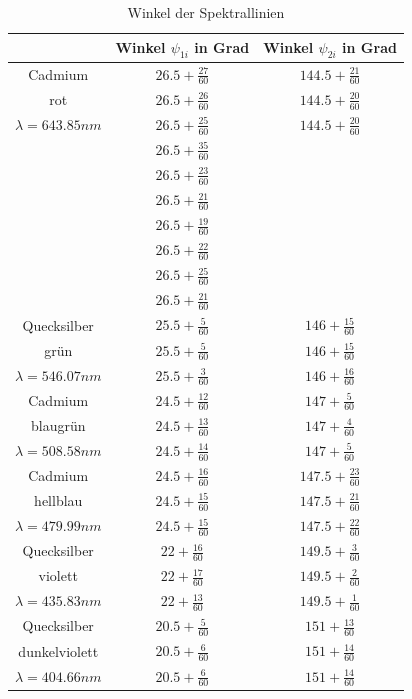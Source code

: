 \documentclass[12pt,a4paper]{article}
\begin{document}
\begin{table}[H]
	\centering
	\begin{tabular}{|c|c|c|}
		\hline
		& Winkel $\psi_{1i}$ in Grad & Winkel $\psi_{2i}$ in Grad\\
		\hline
		Cadmium&$26.5+\frac{27}{60}$&$144.5+\frac{21}{60}$\\[0.1cm]
		rot&$26.5+\frac{26}{60}$&$144.5+\frac{20}{60}$\\[0.1cm]
		$\lambda=643.85nm$&$26.5+\frac{25}{60}$&$144.5+\frac{20}{60}$\\[0.1cm]
		&$26.5+\frac{35}{60}$&\\[0.1cm]
		&$26.5+\frac{23}{60}$&\\[0.1cm]
		&$26.5+\frac{21}{60}$&\\[0.1cm]
		&$26.5+\frac{19}{60}$&\\[0.1cm]
		&$26.5+\frac{22}{60}$&\\[0.1cm]
		&$26.5+\frac{25}{60}$&\\[0.1cm]
		&$26.5+\frac{21}{60}$&\\[0.1cm]
		\hline
		Quecksilber&$25.5+\frac{5}{60}$&$146+\frac{15}{60}$\\[0.1cm]
		grün&$25.5+\frac{5}{60}$&$146+\frac{15}{60}$\\[0.1cm]
		$\lambda=546.07nm$&$25.5+\frac{3}{60}$&$146+\frac{16}{60}$\\[0.1cm]
		\hline
		Cadmium&$24.5+\frac{12}{60}$&$147+\frac{5}{60}$\\[0.1cm]
		blaugrün&$24.5+\frac{13}{60}$&$147+\frac{4}{60}$\\[0.1cm]
		$\lambda=508.58nm$&$24.5+\frac{14}{60}$&$147+\frac{5}{60}$\\[0.1cm]
		\hline
		Cadmium&$24.5+\frac{16}{60}$&$147.5+\frac{23}{60}$\\[0.1cm]
		hellblau&$24.5+\frac{15}{60}$&$147.5+\frac{21}{60}$\\[0.1cm]
		$\lambda=479.99nm$&$24.5+\frac{15}{60}$&$147.5+\frac{22}{60}$\\[0.1cm]
		\hline
		Quecksilber&$22+\frac{16}{60}$&$149.5+\frac{3}{60}$\\[0.1cm]
		violett&$22+\frac{17}{60}$&$149.5+\frac{2}{60}$\\[0.1cm]
		$\lambda=435.83nm$&$22+\frac{13}{60}$&$149.5+\frac{1}{60}$\\[0.1cm]
		\hline
		Quecksilber&$20.5+\frac{5}{60}$&$151+\frac{13}{60}$\\[0.1cm]
		dunkelviolett&$20.5+\frac{6}{60}$&$151+\frac{14}{60}$\\[0.1cm]
		$\lambda=404.66nm$&$20.5+\frac{6}{60}$&$151+\frac{14}{60}$\\[0.1cm]
		\hline
	\end{tabular}
	\caption{Winkel der Spektrallinien}
	\label{table:Winkel_Rohdaten}
\end{table}
\end{document}
